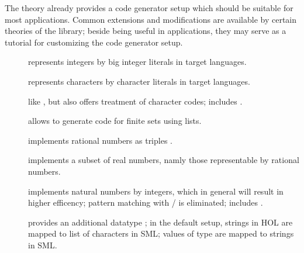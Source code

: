 \begin{isabellebody}
\begin{isamarkuptext}
\begin{itemize}
  \end{itemize}%
\end{isamarkuptext}%
\isamarkuptrue%
%
\isamarkuptrue%
%
\begin{isamarkuptext}%
The   theory already provides a code
  generator setup
  which should be suitable for most applications. Common extensions
  and modifications are available by certain theories of the 
  library; beside being useful in applications, they may serve
  as a tutorial for customizing the code generator setup.

  \begin{description}

    \item[] represents  integers by big
       integer literals in target languages.
    \item[] represents  characters by 
       character literals in target languages.
    \item[] like ,
       but also offers treatment of character codes; includes
       .
    \item[] allows to generate code
       for finite sets using lists.
    \item[] \label{exec_rat} implements rational
       numbers as triples .
    \item[] implements a subset of real numbers,
       namly those representable by rational numbers.
    \item[] \label{eff_nat} implements natural numbers by integers,
       which in general will result in higher efficency; pattern
       matching with  / 
       is eliminated;  includes .
    \item[] provides an additional datatype ;
       in the  default setup, strings in HOL are mapped to list
       of  characters in SML; values of type  are
       mapped to strings in SML.

  \end{description}


\end{isamarkuptext}
\end{isabellebody}
